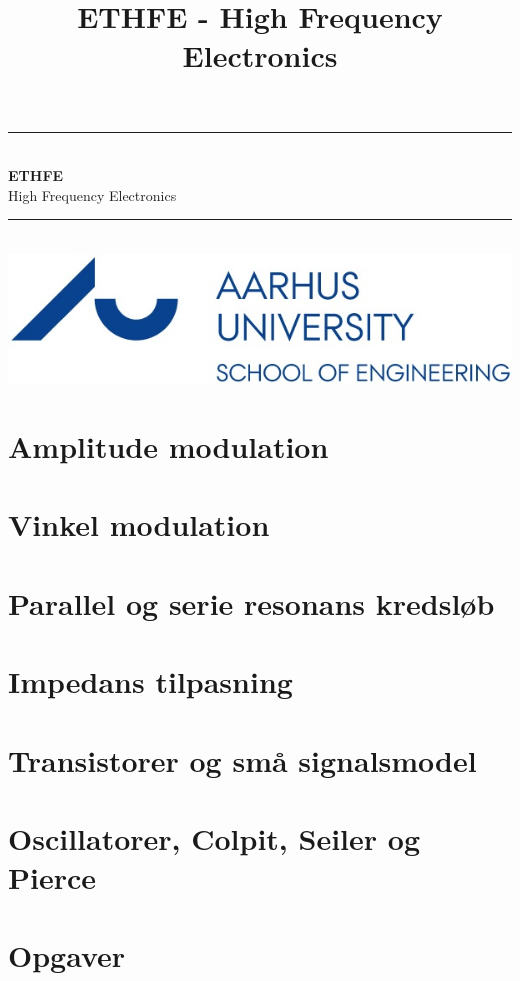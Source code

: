 \documentclass[12pt,a4paper,danish,oneside]{book}
\title{ETHFE - High Frequency Electronics}
\newcommand{\HRule}{\rule{\linewidth}{0.5mm}}
\begin{document}
\begin{titlepage}
	\clearpage\thispagestyle{empty}

	\begin{center}
		\HRule \\[0.4cm]
		{\huge \bfseries ETHFE} \\[.3cm] {\huge High Frequency Electronics}\\[0cm]
		\HRule \\[3.4cm]
		\includegraphics[width=0.5\linewidth]{graphics/au}
	\end{center}
	\renewcommand{\contentsname}{Indholdsfortegnelse}
	\tableofcontents

\end{titlepage}

 

\chapter{Amplitude modulation}


\chapter{Vinkel modulation}


\chapter{Parallel og serie resonans kredsløb}


\chapter{Impedans tilpasning}


\chapter{Transistorer og små signalsmodel}


\chapter{Oscillatorer, Colpit, Seiler og Pierce}


\chapter{Opgaver}




\end{document}
